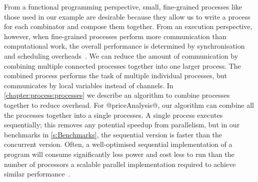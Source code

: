 
From a functional programming perspective, small, fine-grained processes like those used in our example are desirable because they allow us to write a process for each combinator and compose them together.
From an execution perspective, however, when fine-grained processes perform more communication than computational work, the overall performance is determined by synchronisation and scheduling overheads~\cite{chen1990impact}.
We can reduce the amount of communication by combining multiple connected processes together into one larger process.
The combined process performs the task of multiple individual processes, but communicates by local variables instead of channels.
In \cref{chapter:process:processes} we describe an algorithm to combine processes together to reduce overhead.
For @priceAnalysis@, our algorithm can combine all the processes together into a single processes.
A single process executes sequentially; this removes any potential speedup from parallelism, but in our benchmarks in \cref{s:Benchmarks}, the sequential version is faster than the concurrent version.
Often, a well-optimised sequential implementation of a program will consume significantly less power and cost less to run than the number of processors a scalable parallel implementation required to achieve similar performance~\cite{mcsherry2015scalability}.


